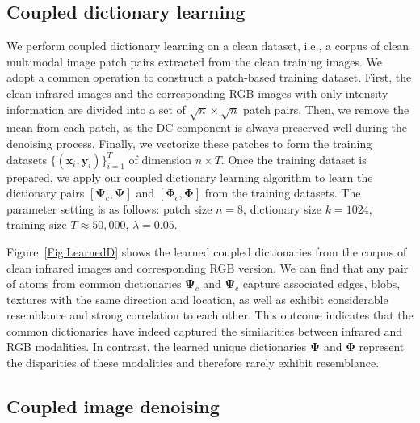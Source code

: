 \documentclass{article}
\begin{document}
\subsection{Coupled dictionary learning}
We perform coupled dictionary learning on a clean dataset, i.e., a corpus of clean multimodal image patch pairs extracted from the clean training images. We adopt a common operation to construct a patch-based training dataset. First, the clean infrared images and the corresponding RGB images with only intensity information are divided into a set of $\sqrt{n} \times \sqrt{n}$ patch pairs. Then, we remove the mean from each patch, as the DC component is always preserved well during the denoising process. Finally, we vectorize these patches to form the training datasets $\{(\mathbf{x}_i, \mathbf{y}_i) \}_{i=1}^T$ of dimension $n \times T$. Once the training dataset is prepared, we apply our coupled dictionary learning algorithm to learn the dictionary pairs $[\boldsymbol{\Psi}_{c},\boldsymbol{\Psi}]$ and $[\boldsymbol{\Phi}_{c},\boldsymbol{\Phi}]$ from the training datasets. The parameter setting is as follows: patch size $ n = 8 $, dictionary size $k= 1024$, training size $T \approx 50,000$, $\lambda = 0.05$. 


Figure~\ref{Fig:LearnedD} shows the learned coupled dictionaries from the corpus of clean infrared images and corresponding RGB version. We can find that any pair of atoms from common dictionaries $\boldsymbol{\Psi}_{c}$ and $\boldsymbol{\Psi}_{c}$ capture associated edges, blobs, textures with the same direction and location, as well as exhibit considerable resemblance and strong correlation to each other. This outcome indicates that the common dictionaries have indeed captured the similarities between infrared and RGB modalities. In contrast, the learned unique dictionaries $\boldsymbol{\Psi}$ and $\boldsymbol{\Phi}$ represent the disparities of these modalities and therefore rarely exhibit resemblance.

\vspace{-0.2cm}

\subsection{Coupled image denoising}
\end{document}
